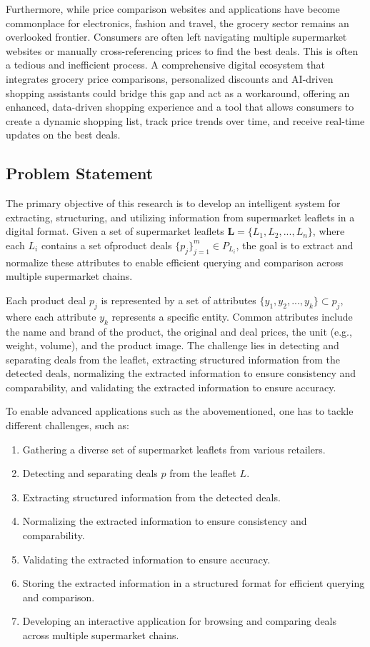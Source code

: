 \documentclass[11pt]{article}
\begin{document}
Furthermore, while price comparison websites and applications have become commonplace for electronics, fashion and travel, the grocery sector remains an overlooked frontier. Consumers are often left navigating multiple supermarket websites or manually cross-referencing prices to find the best deals. This is often a tedious and inefficient process. A comprehensive digital ecosystem that integrates grocery price comparisons, personalized discounts and AI-driven shopping assistants could bridge this gap and act as a workaround, offering an enhanced, data-driven shopping experience and a tool that allows consumers to create a dynamic shopping list, track price trends over time, and receive real-time updates on the best deals.

\subsection{Problem Statement}
The primary objective of this research is to develop an intelligent system for extracting, structuring, and utilizing information from supermarket leaflets in a digital format. Given a set of supermarket leaflets $\mathbf{L} = \{L_1, L_2, ..., L_n\}$, where each $L_i$ contains a set ofproduct deals $\{p_j\}_{j=1}^{m} \in P_{L_i}$, the goal is to extract and normalize these attributes to enable efficient querying and comparison across multiple supermarket chains.

Each product deal $p_j$ is represented by a set of attributes $\{y_1, y_2, ..., y_k\} \subset p_j$, where each attribute $y_k$ represents a specific entity. Common attributes include the name and brand of the product, the original and deal prices, the unit (e.g., weight, volume), and the product image. The challenge lies in detecting and separating deals from the leaflet, extracting structured information from the detected deals, normalizing the extracted information to ensure consistency and comparability, and validating the extracted information to ensure accuracy. 

To enable advanced applications such as the abovementioned, one has to tackle different challenges, such as:
\begin{enumerate}
    \item Gathering a diverse set of supermarket leaflets from various retailers.
    \item Detecting and separating deals $p$ from the leaflet $L$.
    \item Extracting structured information from the detected deals.
    \item Normalizing the extracted information to ensure consistency and comparability.
    \item Validating the extracted information to ensure accuracy.
    \item Storing the extracted information in a structured format for efficient querying and comparison.
    \item Developing an interactive application for browsing and comparing deals across multiple supermarket chains.
\end{enumerate}
\end{document}
